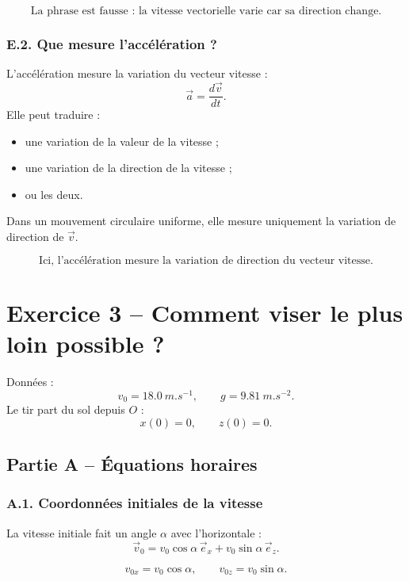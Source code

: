 \documentclass[11pt,a4paper]{article}
\begin{document}
\begin{resultatbox}
\[
\boxed{\text{La phrase est fausse : la vitesse vectorielle varie car sa direction change.}}
\]
\end{resultatbox}

\subsubsection*{E.2. Que mesure l'accélération ?}

L'accélération mesure la variation du vecteur vitesse :
\[
\vec a=\frac{d\vec v}{dt}.
\]
Elle peut traduire :
\begin{itemize}
  \item une variation de la valeur de la vitesse ;
  \item une variation de la direction de la vitesse ;
  \item ou les deux.
\end{itemize}
Dans un mouvement circulaire uniforme, elle mesure uniquement la variation de direction de $\vec v$.

\begin{resultatbox}
\[
\boxed{\text{Ici, l'accélération mesure la variation de direction du vecteur vitesse.}}
\]
\end{resultatbox}

\newpage
\section{Exercice 3 -- Comment viser le plus loin possible ?}

Données :
\[
v_0=\SI{18.0}{m.s^{-1}},\qquad g=\SI{9.81}{m.s^{-2}}.
\]
Le tir part du sol depuis $O$ :
\[
x(0)=0,\qquad z(0)=0.
\]

\subsection{Partie A -- Équations horaires}

\subsubsection*{A.1. Coordonnées initiales de la vitesse}

La vitesse initiale fait un angle $\alpha$ avec l'horizontale :
\[
\vec v_0=v_0\cos\alpha\,\vec e_x+v_0\sin\alpha\,\vec e_z.
\]

\begin{resultatbox}
\[
\boxed{v_{0x}=v_0\cos\alpha,\qquad v_{0z}=v_0\sin\alpha.}
\]
\end{resultatbox}
\end{document}
